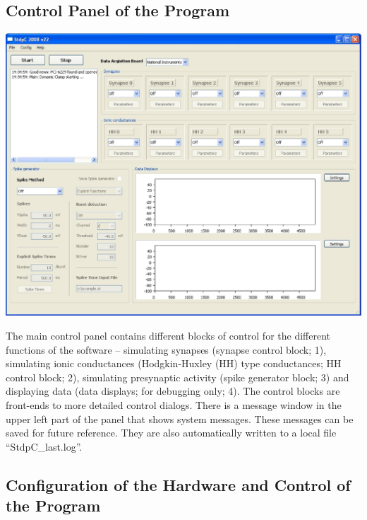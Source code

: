 \documentclass{article}
\begin{document}
\subsection{Control Panel of the Program}

\parbox{\textwidth}{
  \includegraphics[width=\textwidth]{main}
}
\vspace*{0.5cm}

The main control panel contains different blocks of control for the
different functions of the software -- simulating synapses (synapse
control block; 1), simulating ionic conductances (Hodgkin-Huxley (HH)
type conductances; HH control block; 2), simulating presynaptic
activity (spike generator block; 3) and displaying data (data
displays; for debugging only; 4). The control blocks are front-ends to
more detailed control dialogs. There is a message window in the upper
left part of the panel that shows system messages. These messages can
be saved for future reference. They are also automatically written to
a local file ``StdpC\_last.log''.


\subsection{Configuration of the Hardware and Control of the Program}
\end{document}
